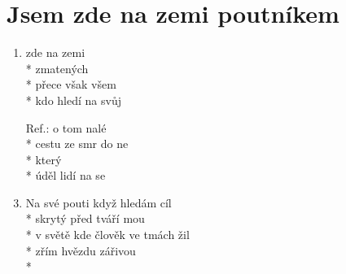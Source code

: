 \section{Jsem zde na zemi poutníkem}
\begin{enumerate}
\item {}zde na zemi  \\*
 zmatených   \\*
  přece však  všem \\*
kdo hledí na svůj  
\item[Ref.:]  o tom  nalé \\*
cestu  ze smr do ne  \\*
  který    \\*
úděl lidí  na se 
\item Na své pouti když hledám cíl \\*
skrytý před tváří mou \\*
v světě kde člověk ve tmách žil \\*
zřím hvězdu zářivou \\*
\end{enumerate}

